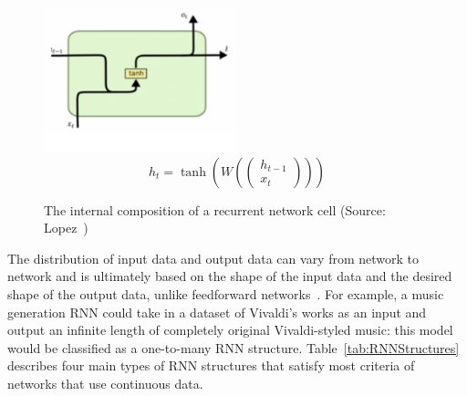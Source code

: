 \begin{figure}[th]
    \centering
    \includegraphics[width=0.5\textwidth]{Figures/rnnarch.png}
    \[ h_t = \tanh(W(
        \begin{pmatrix}
            h_{t-1} \\ x_t
        \end{pmatrix}
    )) \]
    \decoRule
    \caption[RNN Cell]{The internal composition of a recurrent network cell (Source: Lopez~\cite{lopez_2019})}
    \label{fig:RNNCell}
\end{figure}

The distribution of input data and output data can vary from network to network and is ultimately based on the shape of the input data and the desired shape of the output data, unlike feedforward networks~\cite{ibm_cloud_education_2020}. For example, a music generation RNN could take in a dataset of Vivaldi’s works as an input and output an infinite length of completely original Vivaldi-styled music: this model would be classified as a one-to-many RNN structure. Table~\ref{tab:RNNStructures} describes four main types of RNN structures that satisfy most criteria of networks that use continuous data.

